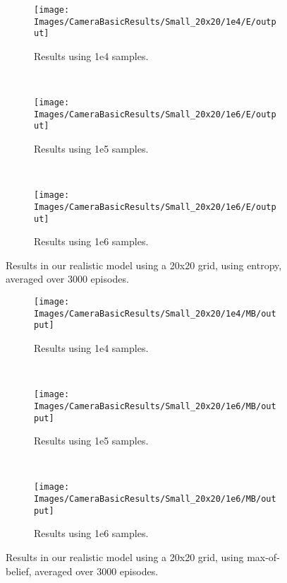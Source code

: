 \begin{figure}[ht]
        \centering
        \begin{subfigure}[t]{0.3\textwidth}
                \texttt{[image: Images/CameraBasicResults/Small\_20x20/1e4/E/output]}
                \caption{Results using 1e4 samples.}
                \label{fig:cws4e}
        \end{subfigure}%
        ~ %
        \begin{subfigure}[t]{0.3\textwidth}
                \texttt{[image: Images/CameraBasicResults/Small\_20x20/1e6/E/output]}
                \caption{Results using 1e5 samples.}
                \label{fig:cws5e}
        \end{subfigure}
        ~ %
        \begin{subfigure}[t]{0.3\textwidth}
                \texttt{[image: Images/CameraBasicResults/Small\_20x20/1e6/E/output]}
                \caption{Results using 1e6 samples.}
                \label{fig:cws6e}
        \end{subfigure}
        \caption{Results in our realistic model using a 20x20 grid, using entropy, averaged over 3000 episodes.}\label{fig:cwse}
\end{figure}

\begin{figure}[ht]
        \centering
        \begin{subfigure}[t]{0.3\textwidth}
                \texttt{[image: Images/CameraBasicResults/Small\_20x20/1e4/MB/output]}
                \caption{Results using 1e4 samples.}
                \label{fig:cws4mb}
        \end{subfigure}%
        ~ %
        \begin{subfigure}[t]{0.3\textwidth}
                \texttt{[image: Images/CameraBasicResults/Small\_20x20/1e6/MB/output]}
                \caption{Results using 1e5 samples.}
                \label{fig:cws5mb}
        \end{subfigure}
        ~ %
        \begin{subfigure}[t]{0.3\textwidth}
                \texttt{[image: Images/CameraBasicResults/Small\_20x20/1e6/MB/output]}
                \caption{Results using 1e6 samples.}
                \label{fig:cws6mb}
        \end{subfigure}
        \caption{Results in our realistic model using a 20x20 grid, using max-of-belief, averaged over 3000 episodes.}\label{fig:cwsmb}
\end{figure}

